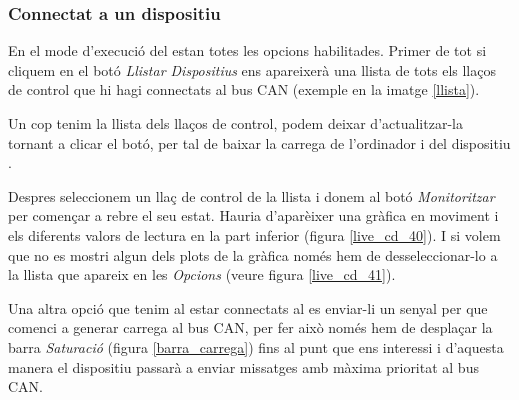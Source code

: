 
\clearpage

\subsubsection{Connectat a un dispositiu \Monitor}\label{cap:gui:cd:dcsmonitor:monitor}

En el mode d'execució del \Monitor estan totes les opcions habilitades. Primer de tot si cliquem en el botó \emph{Llistar Dispositius} ens apareixerà una llista de tots els llaços de control que hi hagi connectats al bus CAN (exemple en la imatge \ref{llista}).


Un cop tenim la llista dels llaços de control, podem deixar d'actualitzar-la tornant a clicar el botó, per tal de baixar la carrega de l'ordinador i del dispositiu \Monitor.

Despres seleccionem un llaç de control de la llista i donem al botó \emph{Monitoritzar} per començar a rebre el seu estat. Hauria d'aparèixer una gràfica en moviment i els diferents valors de lectura en la part inferior (figura \ref{live_cd_40}).
I si volem que no es mostri algun dels plots de la gràfica només hem de desseleccionar-lo a la llista que apareix en les \emph{Opcions} (veure figura \ref{live_cd_41}).


Una altra opció que tenim al estar connectats al \Monitor es enviar-li un senyal per que comenci a generar carrega al bus CAN, per fer això només hem de desplaçar la barra \emph{Saturació} (figura \ref{barra_carrega}) fins al punt que ens interessi i d'aquesta manera el dispositiu \Monitor passarà a enviar missatges amb màxima prioritat al bus CAN.


\clearpage


